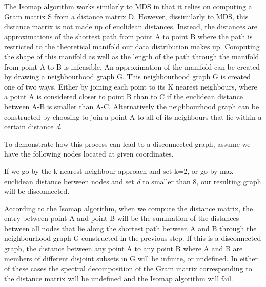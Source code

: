 \documentclass[11pt,a4paper,landscape]{article}
\begin{document}
The Isomap algorithm works similarly to MDS in that it relies on computing a Gram matrix S from a distance matrix D. However, dissimilarly to MDS, this distance matrix is not made up of euclidean distances. Instead, the distances are approximations of the shortest path from point A to point B where the path is restricted to the theoretical manifold our data distribution makes up. Computing the shape of this manifold as well as the length of the path through the manifold from point A to B is infeasible. An approximation of the manifold can be created by drawing a neighbourhood graph G. This neighbourhood graph G is created one of two ways. Either by joining each point to its K nearest neighbours, where a point A is considered closer to point B than to C if the euclidean distance between A-B is smaller than A-C.  Alternatively the neighbourhood graph can be constructed by choosing to join a point A to all of its neighbours that lie within a certain distance \textit{d}.\newline


To demonstrate how this process can lead to a disconnected graph,  assume we have the following nodes located at given coordinates.


If we go by the k-nearest neighbour approach and set k=2, or go by max euclidean distance between nodes and set \textit{d} to smaller than 8, our resulting graph will be disconnected.


According to the Isomap algorithm, when we compute the distance matrix, the entry between point A and point B will be the summation of the distances between all nodes that lie along the shortest path between A and B through the neighbourhood graph G constructed in the previous step. If this is a disconnected graph, the distance between any point A to any point B where A and B are members of different disjoint subsets in G will be infinite, or undefined. In either of these cases the spectral decomposition of the Gram matrix corresponding to the distance matrix will be undefined and the Isomap algorithm will fail.
\end{document}
